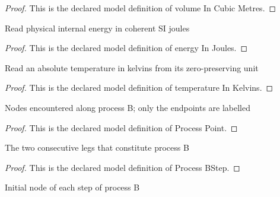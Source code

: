 \begin{proof}
  This is the declared model definition of volume In Cubic Metres.
\end{proof}
\begin{definition}
  \label{def:physics:phyx-mini-0495:phyxminiproblems-problemphyxmini0495-energyinjoules}
  Read physical internal energy in coherent SI joules
\end{definition}
\begin{proof}
  This is the declared model definition of energy In Joules.
\end{proof}
\begin{definition}
  \label{def:physics:phyx-mini-0495:phyxminiproblems-problemphyxmini0495-temperatureinkelvins}
  Read an absolute temperature in kelvins from its zero-preserving unit
\end{definition}
\begin{proof}
  This is the declared model definition of temperature In Kelvins.
\end{proof}
\begin{definition}
  \label{def:physics:phyx-mini-0495:phyxminiproblems-problemphyxmini0495-processpoint}
  Nodes encountered along process B; only the endpoints are labelled
\end{definition}
\begin{proof}
  This is the declared model definition of Process Point.
\end{proof}
\begin{definition}
  \label{def:physics:phyx-mini-0495:phyxminiproblems-problemphyxmini0495-processbstep}
  The two consecutive legs that constitute process B
\end{definition}
\begin{proof}
  This is the declared model definition of Process BStep.
\end{proof}
\begin{definition}
  \label{def:physics:phyx-mini-0495:phyxminiproblems-problemphyxmini0495-processbstepstart}
  Initial node of each step of process B
\end{definition}
